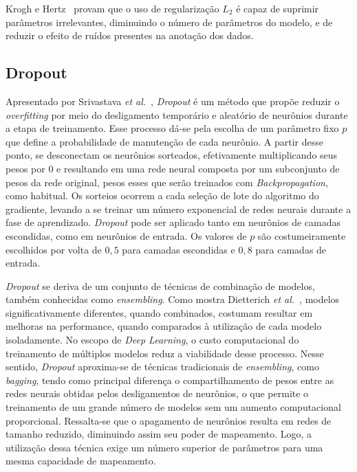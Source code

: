 Krogh e Hertz~\cite{krogh92} provam que o uso de regularização $L_{2}$ é capaz de suprimir parâmetros irrelevantes,
diminuindo o número de parâmetros do modelo, e de reduzir o efeito de ruídos presentes na anotação dos dados.

\subsection{Dropout}

Apresentado por Srivastava \textit{et al.}~\cite{srivastava14}, \textit{Dropout} é um método que propõe reduzir o
\textit{overfitting} por meio do desligamento temporário e aleatório de neurônios durante a etapa de treinamento.
Esse processo dá-se pela escolha de um parâmetro fixo $p$ que define a probabilidade de manutenção de cada neurônio.
A partir desse ponto, se desconectam os neurônios sorteados, efetivamente multiplicando seus pesos por 0 e resultando
em uma rede neural composta por um subconjunto de pesos da rede original, pesos esses que serão treinados com
\textit{Backpropagation}, como habitual.
Os sorteios ocorrem a cada seleção de lote do algoritmo do gradiente, levando a se treinar um número exponencial de
redes neurais durante a fase de aprendizado.
\textit{Dropout} pode ser aplicado tanto em neurônios de camadas escondidas, como em neurônios de entrada.
Os valores de $p$ são costumeiramente escolhidos por volta de $0,5$ para camadas escondidas e $0,8$ para camadas de
entrada.

\textit{Dropout} se deriva de um conjunto de técnicas de combinação de modelos, também conhecidas como
\textit{ensembling}.
Como mostra Dietterich \textit{et al.}~\cite{dietterich00}, modelos significativamente diferentes, quando combinados,
costumam resultar em melhoras na performance, quando comparados à utilização de cada modelo isoladamente.
No escopo de \textit{Deep Learning}, o custo computacional do treinamento de múltiplos modelos reduz a viabilidade desse
processo.
Nesse sentido, \textit{Dropout} aproxima-se de técnicas tradicionais de \textit{ensembling}, como \textit{bagging},
tendo como principal diferença o compartilhamento de pesos entre as redes neurais obtidas pelos desligamentos de
neurônios, o que permite o treinamento de um grande número de modelos sem um aumento computacional proporcional.
Ressalta-se que o apagamento de neurônios resulta em redes de tamanho reduzido, diminuindo assim seu poder de
mapeamento.
Logo, a utilização dessa técnica exige um número superior de parâmetros para uma mesma capacidade de mapeamento.


